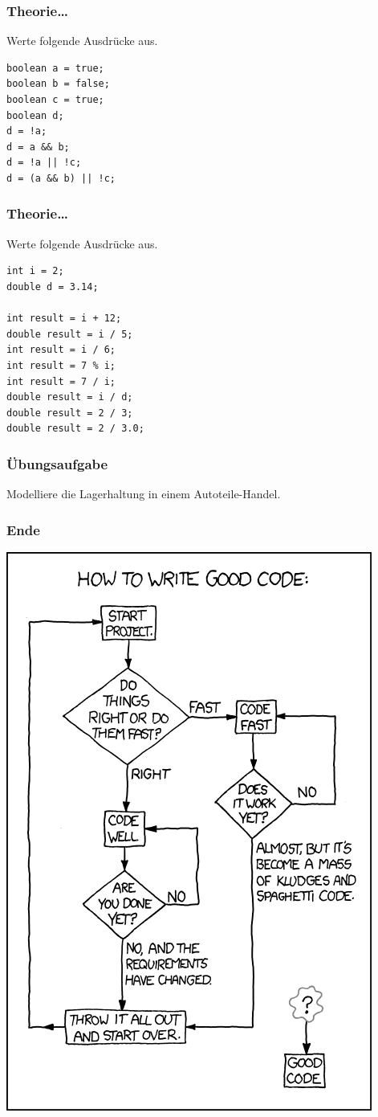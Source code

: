 \documentclass{beamer}
\begin{document}
\begin{frame}[fragile]
\frametitle{Theorie\ldots}
Werte folgende Ausdr\"{u}cke aus.
\begin{verbatim}
boolean a = true;
boolean b = false;
boolean c = true;
boolean d;
d = !a;
d = a && b;
d = !a || !c;
d = (a && b) || !c;
\end{verbatim}
\end{frame}

\begin{frame}[fragile]
\frametitle{Theorie\ldots}
Werte folgende Ausdr\"{u}cke aus.
\begin{verbatim}
int i = 2;
double d = 3.14;

int result = i + 12;
double result = i / 5;
int result = i / 6;
int result = 7 % i;
int result = 7 / i;
double result = i / d;
double result = 2 / 3;
double result = 2 / 3.0;
\end{verbatim}
\end{frame}

\begin{frame}
    \frametitle{\"Ubungsaufgabe}
    Modelliere die Lagerhaltung in einem Autoteile-Handel.
\end{frame}

\begin{frame}
\frametitle{Ende}
\begin{center}
\includegraphics[scale=.28]{good_code.png}
\end{center}
\end{frame}
\end{document}
